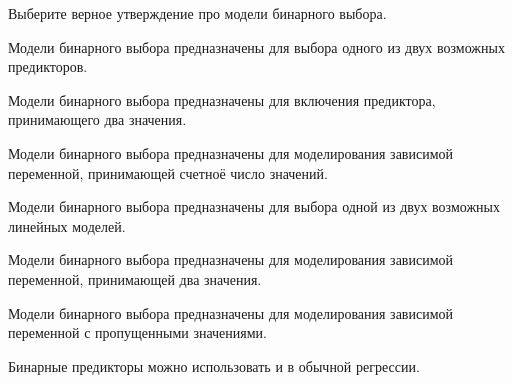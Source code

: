 
\begin{question}
Выберите верное утверждение про модели бинарного выбора.
\begin{answerlist}
  \item Модели бинарного выбора предназначены для выбора одного из двух возможных предикторов.
  \item Модели бинарного выбора предназначены для включения предиктора, принимающего два значения.
  \item Модели бинарного выбора предназначены для моделирования зависимой переменной, принимающей счетноё число значений.
  \item Модели бинарного выбора предназначены для выбора одной из двух возможных линейных моделей.
  \item Модели бинарного выбора предназначены для моделирования зависимой переменной, принимающей два значения.
  \item Модели бинарного выбора предназначены для моделирования зависимой переменной с пропущенными значениями.
\end{answerlist}
\end{question}

\begin{solution}
Бинарные предикторы можно использовать и в обычной регрессии.
\end{solution}

